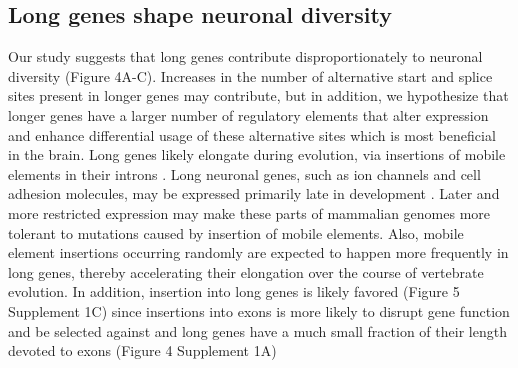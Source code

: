 
\subsection{Long genes shape neuronal diversity}
Our study suggests that long genes contribute disproportionately to neuronal diversity (Figure 4A-C). Increases in the number of alternative start and splice sites present in longer genes may contribute, but in addition, we hypothesize that longer genes have a larger number of regulatory elements that alter expression and enhance differential usage of these alternative sites which is most beneficial in the brain. Long genes likely elongate during evolution, via insertions of mobile elements in their introns \citep{Sela_2007,Grishkevich_2014}. Long neuronal genes, such as ion channels and cell adhesion molecules, may be expressed primarily late in development \citep{Okaty_2009}. Later and more restricted expression may make these parts of mammalian genomes more tolerant to mutations caused by insertion of mobile elements. Also, mobile element insertions occurring randomly are expected to happen more frequently in long genes, thereby accelerating their elongation over the course of vertebrate evolution. In addition, insertion into long genes is likely favored (Figure 5 Supplement 1C) since insertions into exons is more likely to disrupt gene function and be selected against and long genes have a much small fraction of their length devoted to exons (Figure 4 Supplement 1A) %

